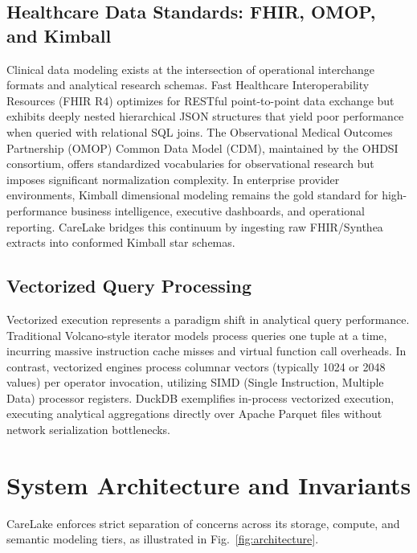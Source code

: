 \documentclass[10pt,journal,compsoc]{IEEEtran}
\begin{document}
\subsection{Healthcare Data Standards: FHIR, OMOP, and Kimball}
Clinical data modeling exists at the intersection of operational interchange formats and analytical research schemas. Fast Healthcare Interoperability Resources (FHIR R4) optimizes for RESTful point-to-point data exchange but exhibits deeply nested hierarchical JSON structures that yield poor performance when queried with relational SQL joins. The Observational Medical Outcomes Partnership (OMOP) Common Data Model (CDM), maintained by the OHDSI consortium, offers standardized vocabularies for observational research but imposes significant normalization complexity. In enterprise provider environments, Kimball dimensional modeling remains the gold standard for high-performance business intelligence, executive dashboards, and operational reporting. CareLake bridges this continuum by ingesting raw FHIR/Synthea extracts into conformed Kimball star schemas.

\subsection{Vectorized Query Processing}
Vectorized execution represents a paradigm shift in analytical query performance. Traditional Volcano-style iterator models process queries one tuple at a time, incurring massive instruction cache misses and virtual function call overheads. In contrast, vectorized engines process columnar vectors (typically 1024 or 2048 values) per operator invocation, utilizing SIMD (Single Instruction, Multiple Data) processor registers. DuckDB exemplifies in-process vectorized execution, executing analytical aggregations directly over Apache Parquet files without network serialization bottlenecks.

\section{System Architecture and Invariants}
CareLake enforces strict separation of concerns across its storage, compute, and semantic modeling tiers, as illustrated in Fig.~\ref{fig:architecture}.
\end{document}
